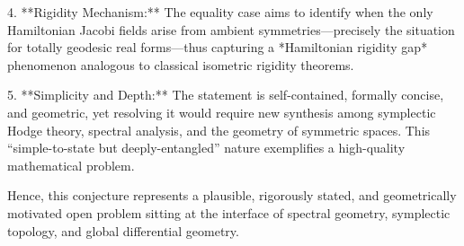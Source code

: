 4. **Rigidity Mechanism:**  
   The equality case aims to identify when the only Hamiltonian Jacobi fields arise from ambient symmetries—precisely the situation for totally geodesic real forms—thus capturing a *Hamiltonian rigidity gap* phenomenon analogous to classical isometric rigidity theorems.

5. **Simplicity and Depth:**  
   The statement is self-contained, formally concise, and geometric, yet resolving it would require new synthesis among symplectic Hodge theory, spectral analysis, and the geometry of symmetric spaces. This “simple-to-state but deeply-entangled” nature exemplifies a high-quality mathematical problem.

Hence, this conjecture represents a plausible, rigorously stated, and geometrically motivated open problem sitting at the interface of spectral geometry, symplectic topology, and global differential geometry.